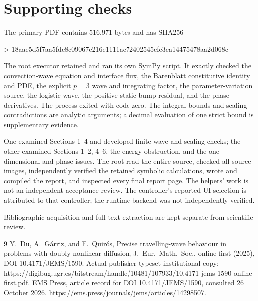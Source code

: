 \documentclass[10pt]{article}
\begin{document}
\section*{Supporting checks}
The primary PDF contains 516,971 bytes and has SHA256\par
> 18aae5d5f7aa5fdc8c09067c216e1111ac72402545cfe3ea14475478aa2d068c\par
The root executor retained and ran its own SymPy script. It exactly checked the convection-wave equation and interface flux, the Barenblatt constitutive identity and PDE, the explicit \(p=3\) wave and integrating factor, the parameter-variation source, the logistic wave, the positive static-bump residual, and the phase derivatives. The process exited with code zero. The integral bounds and scaling contradictions are analytic arguments; a decimal evaluation of one strict bound is supplementary evidence.\par
One examined Sections 1–4 and developed finite-wave and scaling checks; the other examined Sections 1–2, 4–6, the energy obstruction, and the one-dimensional and phase issues. The root read the entire source, checked all source images, independently verified the retained symbolic calculations, wrote and compiled the report, and inspected every final report page. The helpers’ work is not an independent acceptance review. The controller’s reported UI selection is attributed to that controller; the runtime backend was not independently verified.\par
Bibliographic acquisition and full text extraction are kept separate from scientific review.\par
9 Y. Du, A. Gárriz, and F. Quirós, Precise travelling-wave behaviour in problems with doubly nonlinear diffusion, J. Eur. Math. Soc., online first (2025), DOI 10.4171/JEMS/1590. Actual publisher-typeset institutional copy: https://digibug.ugr.es/bitstream/handle/10481/107933/10.4171-jems-1590-online-first.pdf. EMS Press, article record for DOI 10.4171/JEMS/1590, consulted 26 October 2026. https://ems.press/journals/jems/articles/14298507.\par
\end{document}
